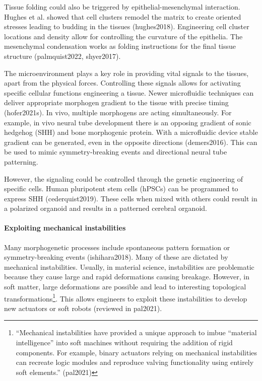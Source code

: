 \documentclass[
]{article}
\begin{document}
Tissue folding could also be triggered by epithelial-mesenchymal
interaction. Hughes et al. showed that cell clusters remodel the matrix
to create oriented stresses leading to budding in the tissues
(hughes2018). Engineering cell cluster locations and density allow for
controlling the curvature of the epithelia. The mesenchymal condensation
works as folding instructions for the final tissue structure
(palmquist2022, shyer2017).

The microenvironment plays a key role in providing vital signals to the
tissues, apart from the physical forces. Controlling these signals
allows for activating specific cellular functions engineering a tissue.
Newer microfluidic techniques can deliver appropriate morphogen gradient
to the tissue with precise timing (hofer2021s). In vivo, multiple
morphogens are acting simultaneously. For example, in vivo neural tube
development there is an opposing gradient of sonic hedgehog (SHH) and
bone morphogenic protein. With a microfluidic device stable gradient can
be generated, even in the opposite directions (demers2016). This can be
used to mimic symmetry-breaking events and directional neural tube
patterning.

However, the signaling could be controlled through the genetic
engineering of specific cells. Human pluripotent stem cells (hPSCs) can
be programmed to express SHH (cederquist2019). These cells when mixed
with others could result in a polarized organoid and results in a
patterned cerebral organoid.

\hypertarget{exploiting-mechanical-instabilities}{%
\paragraph{Exploiting mechanical
instabilities}\label{exploiting-mechanical-instabilities}}

Many morphogenetic processes include spontaneous pattern formation or
symmetry-breaking events (ishihara2018). Many of these are dictated by
mechanical instabilities. Usually, in material science, instabilities
are problematic because they cause large and rapid deformations causing
breakage. However, in soft matter, large deformations are possible and
lead to interesting topological transformations\footnote{``Mechanical
  instabilities have provided a unique approach to imbue ``material
  intelligence'' into soft machines without requiring the addition of
  rigid components. For example, binary actuators relying on mechanical
  instabilities can recreate logic modules and reproduce valving
  functionality using entirely soft elements.'' (pal2021)}. This allows
engineers to exploit these instabilities to develop new actuators or
soft robots (reviewed in pal2021).
\end{document}
